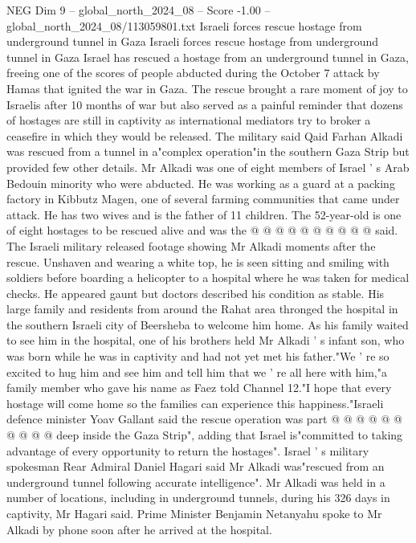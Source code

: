 \begin{textsample}{NEG Dim 9 – global\_north\_2024\_08 – Score -1.00 – global\_north\_2024\_08/113059801.txt}  \label{ex:f9_neg_264}
Israeli forces rescue hostage from underground tunnel in Gaza Israeli forces rescue hostage from underground tunnel in Gaza Israel has rescued a hostage from an underground tunnel in Gaza, freeing one of the scores of people abducted during the October 7 attack by Hamas that ignited the war in Gaza.
The rescue brought a rare moment of joy to Israelis after 10 months of war but also served as a painful reminder that dozens of hostages are still in captivity as international mediators try to broker a ceasefire in which they would be released.
The military said Qaid Farhan Alkadi was rescued from a tunnel in a"complex operation"in the southern Gaza Strip but provided few other details.
Mr Alkadi was one of eight members of Israel ' s Arab Bedouin minority who were abducted.
He was working as a guard at a packing factory in Kibbutz Magen, one of several farming communities that came under attack.
He has two wives and is the father of 11 children.
The 52-year-old is one of eight hostages to be rescued alive and was the @ @ @ @ @ @ @ @ @ @ said.
The Israeli military released footage showing Mr Alkadi moments after the rescue.
Unshaven and wearing a white top, he is seen sitting and smiling with soldiers before boarding a helicopter to a hospital where he was taken for medical checks.
He appeared gaunt but doctors described his condition as stable.
His large family and residents from around the Rahat area thronged the hospital in the southern Israeli city of Beersheba to welcome him home.
As his family waited to see him in the hospital, one of his brothers held Mr Alkadi ' s infant son, who was born while he was in captivity and had not yet met his father."We ' re so excited to hug him and see him and tell him that we ' re all here with him,"a family member who gave his name as Faez told Channel 12."I hope that every hostage will come home so the families can experience this happiness."Israeli defence minister Yoav Gallant said the rescue operation was part @ @ @ @ @ @ @ @ @ @ deep inside the Gaza Strip", adding that Israel is"committed to taking advantage of every opportunity to return the hostages".
Israel ' s military spokesman Rear Admiral Daniel Hagari said Mr Alkadi was"rescued from an underground tunnel following accurate intelligence".
Mr Alkadi was held in a number of locations, including in underground tunnels, during his 326 days in captivity, Mr Hagari said.
Prime Minister Benjamin Netanyahu spoke to Mr Alkadi by phone soon after he arrived at the hospital.

\end{textsample}
